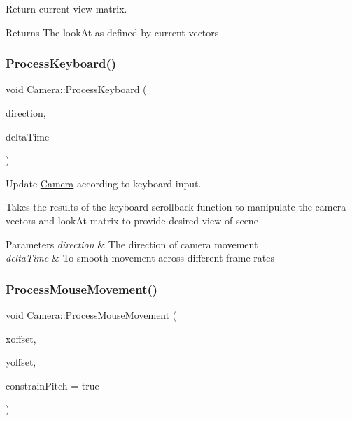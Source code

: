 Return current view matrix. 

\begin{DoxyReturn}{Returns}
The look\+At as defined by current vectors 
\end{DoxyReturn}
\hypertarget{class_camera_ac7e9a7f3e63c670fd695a8f03d02dbdf}{}\label{class_camera_ac7e9a7f3e63c670fd695a8f03d02dbdf} 
\subsubsection{\texorpdfstring{Process\+Keyboard()}{ProcessKeyboard()}}
{\footnotesize\ttfamily void Camera\+::\+Process\+Keyboard (\begin{DoxyParamCaption}\item[{\hyperlink{_camera_8hpp_a605494501af59c9191e7e4d6f9a0ebcb}{Camera\+\_\+\+Movement}}]{direction,  }\item[{G\+Lfloat}]{delta\+Time }\end{DoxyParamCaption})}



Update \hyperlink{class_camera}{Camera} according to keyboard input. 

Takes the results of the keyboard scrollback function to manipulate the camera vectors and look\+At matrix to provide desired view of scene 
\begin{DoxyParams}{Parameters}
{\em direction} & The direction of camera movement \\
\hline
{\em delta\+Time} & To smooth movement across different frame rates \\
\hline
\end{DoxyParams}
\hypertarget{class_camera_a97ffbf8d8935fc63bd2ca71a4268eec4}{}\label{class_camera_a97ffbf8d8935fc63bd2ca71a4268eec4} 
\subsubsection{\texorpdfstring{Process\+Mouse\+Movement()}{ProcessMouseMovement()}}
{\footnotesize\ttfamily void Camera\+::\+Process\+Mouse\+Movement (\begin{DoxyParamCaption}\item[{G\+Lfloat}]{xoffset,  }\item[{G\+Lfloat}]{yoffset,  }\item[{G\+Lboolean}]{constrain\+Pitch = {\ttfamily true} }\end{DoxyParamCaption})}



